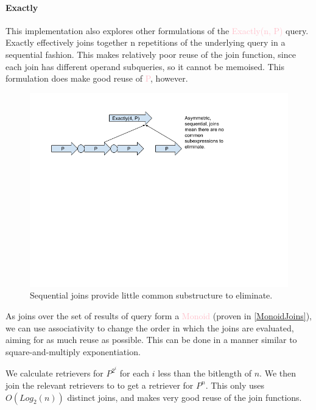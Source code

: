 \documentclass[12pt,a4paper,twoside,openright]{report}
\newcommand\mathName[1]{\textcolor{pink}{#1}}
\begin{document}
		\paragraph{Exactly}
		This implementation also explores other formulations of the \mathName{Exactly(n, P)} query. Exactly effectively joins together n repetitions of the underlying query in a sequential fashion. This makes relatively poor reuse of the join function, since each join has different operand subqueries, so it cannot be memoised. This formulation does make good reuse of \mathName{P}, however.
		

\begin{figure}[ht]
\centering
  \includegraphics[width=\textwidth]{figs/SequentialJoins.png}
  \caption{Sequential joins provide little common substructure to eliminate.}
  \label{fig:SequentialJoins}
\end{figure}
		
		
		As joins over the set of results of query form a \mathName{Monoid} (proven in \ref{MonoidJoins}), we can use associativity to change the order in which the joins are evaluated, aiming for as much reuse as possible. This can be done in a manner similar to square-and-multiply exponentiation.

We calculate retrievers for $P^{2^i}$ for each $i$ less than the bitlength of $n$. We then join the relevant retrievers to to get a retriever for $P^n$. This only uses $O(Log_2(n))$ distinct joins, and makes very good reuse of the join functions. 
\end{document}
